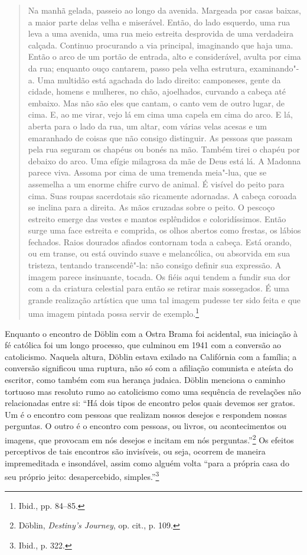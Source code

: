 \begin{quote}
Na manhã gelada, passeio ao longo da avenida. Margeada por casas baixas,
a maior parte delas velha e miserável. Então, do lado esquerdo, uma rua
leva a uma avenida, uma rua meio estreita desprovida de uma verdadeira
calçada. Continuo procurando a via principal, imaginando que haja uma.
Então o arco de um portão de entrada, alto e considerável, avulta por
cima da rua; enquanto ouço cantarem, passo pela velha estrutura,
examinando"-a. Uma multidão está agachada do lado direito: camponeses,
gente da cidade, homens e mulheres, no chão, ajoelhados, curvando a
cabeça até embaixo. Mas não são eles que cantam, o canto vem de outro
lugar, de cima. E, ao me virar, vejo lá em cima uma capela em cima do
arco. E lá, aberta para o lado da rua, um altar, com várias velas acesas
e um emaranhado de coisas que não consigo distinguir. As pessoas que
passam pela rua seguram os chapéus ou bonés na mão. Também tirei o
chapéu por debaixo do arco. Uma efígie milagrosa da mãe de Deus está lá.
A Madonna parece viva. Assoma por cima de uma tremenda meia"-lua, que se
assemelha a um enorme chifre curvo de animal. É visível do peito para
cima. Suas roupas sacerdotais são ricamente adornadas. A cabeça coroada
se inclina para a direita. As mãos cruzadas sobre o peito. O pescoço
estreito emerge das vestes e mantos esplêndidos e coloridíssimos. Então
surge uma face estreita e comprida, os olhos abertos como frestas, os
lábios fechados. Raios dourados afiados contornam toda a cabeça. Está
orando, ou em transe, ou está ouvindo suave e melancólica, ou absorvida
em sua tristeza, tentando transcendê"-la: não consigo definir sua
expressão. A imagem parece insinuante, tocada. Os fiéis aqui tendem a
fundir sua dor com a da criatura celestial para então se retirar mais
sossegados. É uma grande realização artística que uma tal imagem pudesse
ter sido feita e que uma imagem pintada possa servir de
exemplo.\footnote{Ibid., pp. 84--85.}
\end{quote}

Enquanto o encontro de Döblin com a Ostra Brama foi acidental, sua
iniciação à fé católica foi um longo processo, que culminou em 1941 com
a conversão ao catolicismo. Naquela altura, Döblin estava exilado na
Califórnia com a família; a conversão significou uma ruptura, não só com
a afiliação comunista e ateísta do escritor, como também com sua herança
judaica. Döblin menciona o caminho tortuoso mas resoluto rumo ao
catolicismo como uma sequência de revelações não relacionadas entre si:
``Há dois tipos de encontro pelos quais devemos ser gratos. Um é o
encontro com pessoas que realizam nossos desejos e respondem nossas
perguntas. O outro é o encontro com pessoas, ou livros, ou
acontecimentos ou imagens, que provocam em nós desejos e incitam em nós
perguntas.''\footnote{Döblin, \textit{Destiny's Journey}, op. cit., p. 109.} Os efeitos perceptivos de tais encontros são invisíveis, ou seja, ocorrem de maneira impremeditada e insondável, assim como alguém
volta ``para a própria casa do seu próprio jeito: desapercebido,
simples.''\footnote{Ibid., p. 322.}

